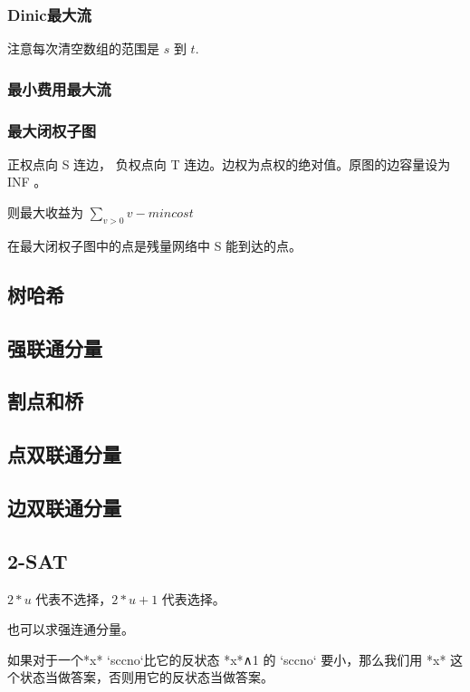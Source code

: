 \documentclass[a4paper]{article}
\begin{document}
\subsubsection{Dinic最大流}
注意每次清空数组的范围是 $s$ 到 $t$.

\subsubsection{最小费用最大流}

\subsubsection{最大闭权子图}
正权点向 S 连边， 负权点向 T 连边。边权为点权的绝对值。原图的边容量设为 INF 。

则最大收益为 $\sum_{v>0}v-mincost$

在最大闭权子图中的点是残量网络中 S 能到达的点。

\subsection{树哈希}

\subsection{强联通分量}

\subsection{割点和桥}

\subsection{点双联通分量}

\subsection{边双联通分量}

\subsection{2-SAT}

$2 * u$ 代表不选择，$2*u+1$ 代表选择。

也可以求强连通分量。

如果对于一个*x* `sccno`比它的反状态 *x*∧1 的 `sccno` 要小，那么我们用 *x* 这个状态当做答案，否则用它的反状态当做答案。


\end{document}
